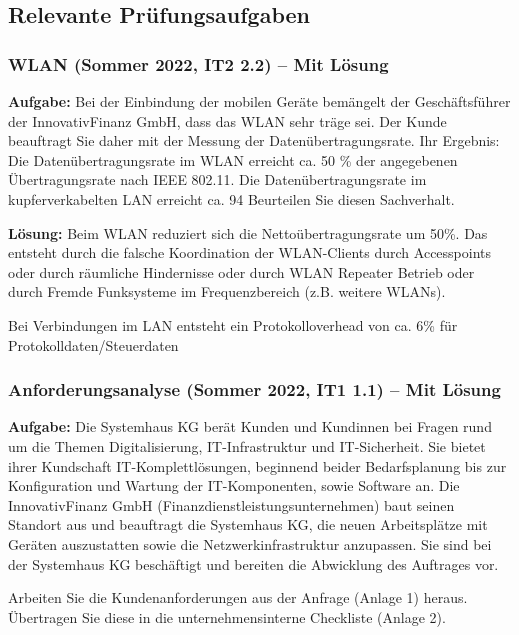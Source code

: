\documentclass[asp1.tex]{subfiles}
\begin{document}
\break

\subsection{Relevante Prüfungsaufgaben}

\subsubsection{WLAN (Sommer 2022, IT2 2.2) – Mit Lösung}

\textbf{Aufgabe:}
Bei der Einbindung der mobilen Geräte bemängelt der Geschäftsführer der InnovativFinanz GmbH, dass das WLAN sehr träge sei. Der Kunde beauftragt Sie daher mit der Messung der Datenübertragungsrate.
Ihr Ergebnis:
Die Datenübertragungsrate im WLAN erreicht ca. 50 \% der angegebenen Übertragungsrate nach IEEE 802.11.
Die Datenübertragungsrate im kupferverkabelten LAN erreicht ca. 94 %
Beurteilen Sie diesen Sachverhalt.

\textbf{Lösung:}
Beim WLAN reduziert sich die Nettoübertragungsrate um 50\%. Das entsteht durch die falsche Koordination der WLAN-Clients durch Accesspoints oder durch räumliche Hindernisse oder durch WLAN Repeater Betrieb oder durch Fremde Funksysteme im Frequenzbereich (z.B. weitere WLANs).

Bei Verbindungen im LAN entsteht ein Protokolloverhead von ca. 6\% für Protokolldaten/Steuerdaten


\subsubsection{Anforderungsanalyse (Sommer 2022, IT1 1.1) – Mit Lösung}

\textbf{Aufgabe:}
Die Systemhaus KG berät Kunden und Kundinnen bei Fragen rund um die Themen Digitalisierung, IT-Infrastruktur und IT-Sicherheit. Sie bietet ihrer Kundschaft IT-Komplettlösungen, beginnend beider Bedarfsplanung bis zur Konfiguration und Wartung der IT-Komponenten, sowie Software an.
Die InnovativFinanz GmbH (Finanzdienstleistungsunternehmen) baut seinen Standort aus und beauftragt die Systemhaus KG, die neuen Arbeitsplätze mit Geräten auszustatten sowie die Netzwerkinfrastruktur anzupassen.
Sie sind bei der Systemhaus KG beschäftigt und bereiten die Abwicklung des Auftrages vor.

Arbeiten Sie die Kundenanforderungen aus der Anfrage (Anlage 1) heraus. Übertragen Sie diese in die unternehmensinterne Checkliste (Anlage 2).
\end{document}
